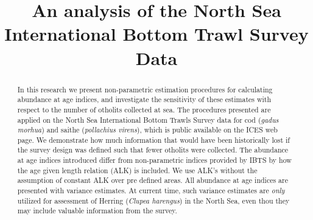 \documentclass[a4paper 12pt]{article}
\title{\bf 
}
\author{}
\date{}
\numberwithin{equation}{section}
\begin{document}
\title{An analysis of the North Sea International Bottom Trawl Survey Data}

\maketitle


\begin{abstract}
In this research we present non-parametric estimation procedures for calculating abundance at age indices, and investigate the sensitivity of these estimates with respect to the number of otholits collected at sea. The procedures presented are applied on the North Sea International Bottom Trawls Survey data for cod (\textit{gadus morhua}) and saithe (\textit{pollachius virens}), which is public available on the ICES web page. We demonstrate how much information that would have been historically lost if the survey design was defined such that fewer otholits were collected. The abundance at age indices introduced differ from non-parametric indices provided by IBTS by how the age given length relation (ALK) is included. We use ALK's without the assumption of constant ALK over pre defined areas. All abundance at age indices are presented with variance estimates. At current time, such variance estimates are \textit{only} utilized for assessment of Herring (\textit{Clupea harengus}) in the North Sea, even thou they may include valuable information from the survey.

\end{abstract}
\end{document}
